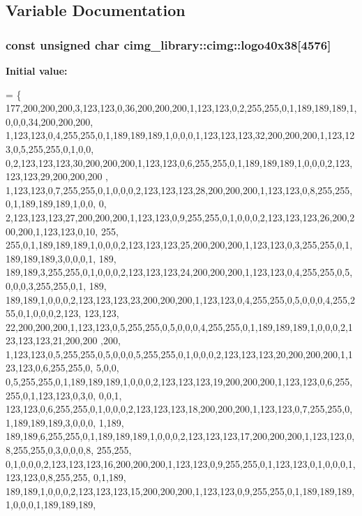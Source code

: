 \subsection{Variable Documentation}
\hypertarget{namespacecimg__library_1_1cimg_a15d560f627f5a64c31d1539c3e157f6a}{
\subsubsection[{logo40x38}]{\setlength{\rightskip}{0pt plus 5cm}const unsigned char cimg\-\_\-library\-::cimg\-::logo40x38\mbox{[}4576\mbox{]}}}\label{namespacecimg__library_1_1cimg_a15d560f627f5a64c31d1539c3e157f6a}
{\bfseries Initial value\-:}
\begin{DoxyCode}
=
\{
  177,200,200,200,3,123,123,0,36,200,200,200,1,123,123,0,2,255,255,0,1,189,189,189,1,0,0,0,34,200,200,200,
  1,123,123,0,4,255,255,0,1,189,189,189,1,0,0,0,1,123,123,123,32,200,200,200,1,123,123,0,5,255,255,0,1,0,0,
  0,2,123,123,123,30,200,200,200,1,123,123,0,6,255,255,0,1,189,189,189,1,0,0,0,2,123,123,123,29,200,200,200
      ,
  1,123,123,0,7,255,255,0,1,0,0,0,2,123,123,123,28,200,200,200,1,123,123,0,8,255,255,0,1,189,189,189,1,0,0,
      0,
  2,123,123,123,27,200,200,200,1,123,123,0,9,255,255,0,1,0,0,0,2,123,123,123,26,200,200,200,1,123,123,0,10,
      255,
  255,0,1,189,189,189,1,0,0,0,2,123,123,123,25,200,200,200,1,123,123,0,3,255,255,0,1,189,189,189,3,0,0,0,1,
      189,
  189,189,3,255,255,0,1,0,0,0,2,123,123,123,24,200,200,200,1,123,123,0,4,255,255,0,5,0,0,0,3,255,255,0,1,
      189,
  189,189,1,0,0,0,2,123,123,123,23,200,200,200,1,123,123,0,4,255,255,0,5,0,0,0,4,255,255,0,1,0,0,0,2,123,
      123,123,
  22,200,200,200,1,123,123,0,5,255,255,0,5,0,0,0,4,255,255,0,1,189,189,189,1,0,0,0,2,123,123,123,21,200,200
      ,200,
  1,123,123,0,5,255,255,0,5,0,0,0,5,255,255,0,1,0,0,0,2,123,123,123,20,200,200,200,1,123,123,0,6,255,255,0,
      5,0,0,
  0,5,255,255,0,1,189,189,189,1,0,0,0,2,123,123,123,19,200,200,200,1,123,123,0,6,255,255,0,1,123,123,0,3,0,
      0,0,1,
  123,123,0,6,255,255,0,1,0,0,0,2,123,123,123,18,200,200,200,1,123,123,0,7,255,255,0,1,189,189,189,3,0,0,0,
      1,189,
  189,189,6,255,255,0,1,189,189,189,1,0,0,0,2,123,123,123,17,200,200,200,1,123,123,0,8,255,255,0,3,0,0,0,8,
      255,255,
  0,1,0,0,0,2,123,123,123,16,200,200,200,1,123,123,0,9,255,255,0,1,123,123,0,1,0,0,0,1,123,123,0,8,255,255,
      0,1,189,
  189,189,1,0,0,0,2,123,123,123,15,200,200,200,1,123,123,0,9,255,255,0,1,189,189,189,1,0,0,0,1,189,189,189,

\end{DoxyCode}
